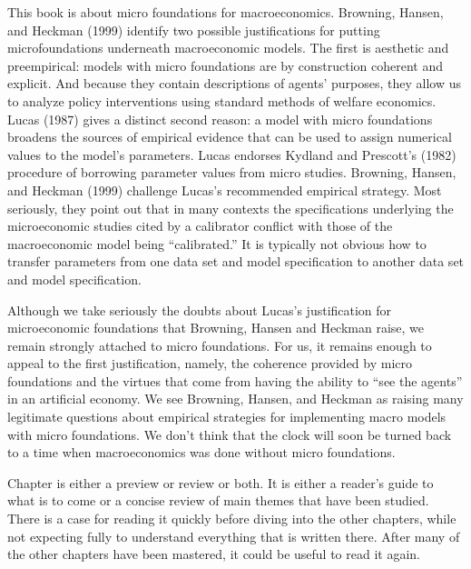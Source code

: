 
\noindent This book is  about micro foundations for macroeconomics.
Browning, Hansen, and Heckman (1999) identify two possible justifications
for putting microfoundations underneath macroeconomic models.
The first is  aesthetic and preempirical: models with micro foundations
are by construction coherent and explicit.   And because they
contain descriptions of agents' purposes, they  allow us to
analyze policy interventions using standard methods of welfare
economics.    Lucas (1987) gives a distinct second reason:
%
       a model with micro foundations     broadens the
sources of empirical evidence that can be used to
assign numerical values to  the model's parameters.    Lucas
endorses  Kydland and Prescott's (1982) procedure of
borrowing parameter values from micro studies.   Browning, Hansen,
and Heckman (1999)  challenge
Lucas's recommended  empirical strategy.
Most seriously, they point out that  in many contexts the
specifications underlying the microeconomic studies  cited by
a calibrator
conflict with those of  the macroeconomic  model being
``calibrated.''    It is typically not obvious how
to transfer parameters from one data set and model specification
to another data set and model specification.
 


  Although we take seriously the doubts
about Lucas's justification for microeconomic foundations
that
Browning, Hansen and  Heckman raise, we remain strongly attached
to micro foundations. For us, it remains enough
to appeal to the first justification, namely, the coherence provided
by micro foundations and the virtues that come from
having the ability to ``see the agents'' in
an artificial economy.
  We see Browning,  Hansen, and  Heckman as raising
 many legitimate
questions about empirical strategies for implementing
macro models with micro foundations.
We don't think that the clock will soon be turned back to a time
when macroeconomics was done without
micro foundations.




\noindent Chapter  is either a preview or review or both. It is either a reader's guide to what is to come or a concise review of main themes
  that have been studied.  There is a case for
reading it quickly before diving into the other chapters, while not expecting fully to understand everything
that is written there. After many of the other chapters have been mastered, it could be useful to read it again.  

